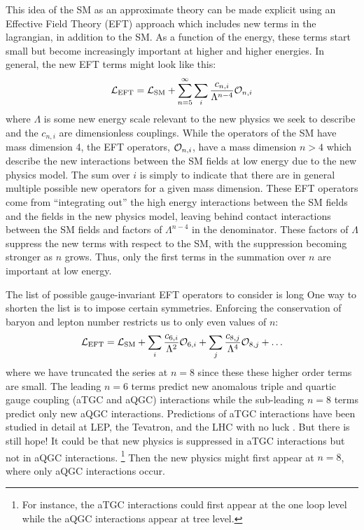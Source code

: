 This idea of the SM as an approximate theory
can be made explicit 
using an Effective Field Theory (EFT) \cite{Pich:1998xt}
approach which includes new terms in the lagrangian, in addition to the SM.
As a function of the energy, these terms start small 
but become increasingly important at higher and higher energies.
In general, the new EFT terms might look like this:
\begin{equation}
\mathcal{L}_{\textrm{EFT}} = \mathcal{L}_{\textrm{SM}} + \sum_{n=5}^{\infty} \sum_i \frac{c_{n,i}}{\Lambda^{n-4}} \mathcal{O}_{n,i}
\end{equation}
where $\Lambda$ is some new energy scale relevant to the new
physics we seek to describe and the $c_{n,i}$ are dimensionless
couplings.  While the operators of the SM have mass dimension 4, the EFT 
operators, $\mathcal{O}_{n,i}$, have a mass dimension
$n>4$ which describe the new interactions between the SM fields at low energy
due to the new physics model.
The sum over $i$ is simply to indicate that there are in general multiple 
possible new operators for a given mass dimension.
These EFT operators come from ``integrating out'' the high energy interactions
between the SM fields and the fields in the new physics model,
leaving behind contact interactions between the SM fields and factors
of $\Lambda^{n-4}$ in the denominator.
These factors of $\Lambda$ suppress the new terms
with respect to the SM, with the suppression becoming stronger as $n$ grows.
Thus, only the first terms in the summation
over $n$ are important at low energy.

The list of possible gauge-invariant EFT operators to 
consider is long \cite{Hagiwara:1993ck,Buchmuller:1985jz,Eboli:2006wa}
One way to shorten the list is to impose certain symmetries. 
Enforcing the conservation
of baryon and lepton number restricts 
us to only even values of $n$:
\begin{equation}
\curlyl_{\textrm{EFT}} = \curlyl_{\textrm{SM}} + \sum_i \frac{c_{6,i}}{\Lambda^2} \curlyo_{6,i} + \sum_j \frac{c_{8,j}}{\Lambda^4} \curlyo_{8,j} + \dots
\label{eq:lagrangian_eft}
\end{equation}
where we have truncated the series at $n=8$ since these
these higher order terms are small.
The leading $n=6$ terms predict new anomalous triple and quartic 
gauge coupling (aTGC and aQGC) interactions while the sub-leading $n=8$ terms
predict only new aQGC interactions. 
Predictions of aTGC interactions have been studied in detail at 
LEP, the Tevatron, and the LHC  with no luck \cite{PDG:2014}.
But there is still hope!
It could be that new physics is suppressed in aTGC interactions
but not in aQGC interactions. \footnote{For instance, the aTGC interactions
could first appear at the one loop level while the aQGC 
interactions appear at tree level.}
Then the new physics might first appear at $n=8$, where only aQGC interactions
occur.



